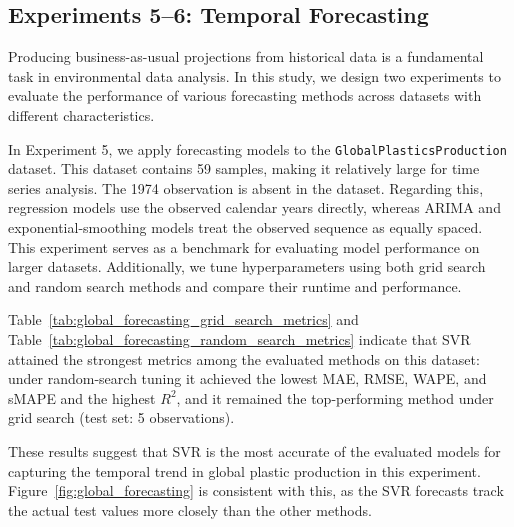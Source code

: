 \subsection{Experiments 5--6: Temporal Forecasting}

Producing business-as-usual projections from historical data is a fundamental task in environmental data analysis. In this study, we design two experiments to evaluate the performance of various forecasting methods across datasets with different characteristics.


In Experiment 5, we apply forecasting models to the \texttt{GlobalPlasticsProduction} dataset. This dataset contains 59 samples, making it relatively large for time series analysis. The 1974 observation is absent in the dataset. Regarding this, regression models use the observed calendar years directly, whereas ARIMA and exponential-smoothing models treat the observed sequence as equally spaced. This experiment serves as a benchmark for evaluating model performance on larger datasets. Additionally, we tune hyperparameters using both grid search and random search methods and compare their runtime and performance.




Table~\ref{tab:global_forecasting_grid_search_metrics} and Table~\ref{tab:global_forecasting_random_search_metrics} indicate that SVR attained the strongest metrics among the evaluated methods on this dataset: under random-search tuning it achieved the lowest MAE, RMSE, WAPE, and sMAPE and the highest \(R^2\), and it remained the top-performing method under grid search (test set: 5 observations).



These results suggest that SVR is the most accurate of the evaluated models for capturing the temporal trend in global plastic production in this experiment. Figure~\ref{fig:global_forecasting} is consistent with this, as the SVR forecasts track the actual test values more closely than the other methods.



